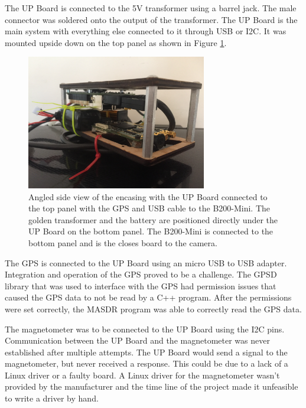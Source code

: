 The UP Board is connected to the 5V transformer using a barrel jack. The male connector was soldered onto the output of the transformer. The UP Board is the main system with everything else connected to it through USB or I2C. It was mounted upside down on the top panel as shown in Figure \ref{fig:box_usb_view}.
\begin{figure}[ht!]
	\centering
	\includegraphics[width=0.70\textwidth]{img/box_usb_view.JPG}
	\caption{Angled side view of the encasing with the UP Board connected to the top panel with the GPS and USB cable to the B200-Mini. The golden transformer and the battery are positioned directly under the UP Board on the bottom panel. The B200-Mini is connected to the bottom panel and is the closes board to the camera.}
	\label{fig:box_usb_view}
\end{figure}\par
The GPS is connected to the UP Board using an micro USB to USB adapter. Integration and operation of the GPS proved to be a challenge. The GPSD library that was used to interface with the GPS had permission issues that caused the GPS data to not be read by a C++ program. After the permissions were set correctly, the MASDR program was able to correctly read the GPS data.\par

The magnetometer was to be connected to the UP Board using the I2C pins. Communication between the UP Board and the magnetometer was never established after multiple attempts. The UP Board would send a signal to the magnetometer, but never received a response. This could be due to a lack of a Linux driver or a faulty board. A Linux driver for the magnetometer wasn't provided by the manufacturer and the time line of the project made it unfeasible to write a driver by hand.\par

